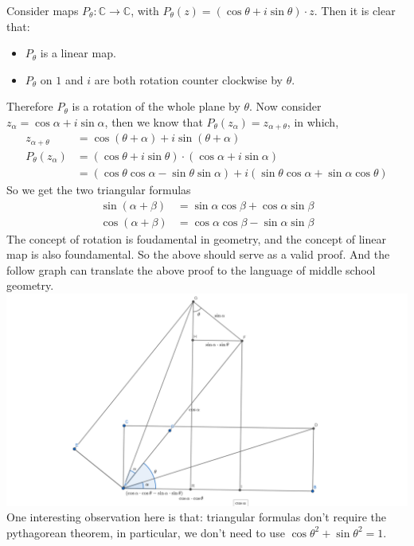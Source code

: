 \documentclass[pdf]{article}
\begin{document}
Consider maps $P_{\theta}: \mathbb{C}\to\mathbb{C}$, with $P_\theta(z) = (\cos\theta + i\sin\theta) \cdot z$. Then it is clear that:
\begin{itemize}
\item $P_{\theta}$ is a linear map.
\item $P_{\theta}$ on $1$ and $i$ are both rotation counter clockwise by $\theta$.
\end{itemize}
Therefore $P_{\theta}$ is a rotation of the whole plane by $\theta$. Now consider $z_\alpha = \cos\alpha + i\sin\alpha$, then we know that $P_\theta(z_\alpha) = z_{\alpha + \theta}$, in which,
\begin{align*}
z_{\alpha + \theta} &= \cos(\theta+\alpha) + i\sin(\theta+\alpha)\\
P_\theta(z_\alpha)  &= (\cos\theta + i\sin\theta)\cdot (\cos\alpha + i\sin\alpha)\\
&= (\cos\theta\cos\alpha  - \sin\theta\sin\alpha) + i(\sin\theta\cos\alpha  + \sin\alpha\cos\theta)
\end{align*}
So we get the two triangular formulas
\begin{align*}
\sin(\alpha+\beta) &= \sin\alpha\cos\beta + \cos\alpha\sin\beta\\
\cos(\alpha+\beta) &= \cos\alpha\cos\beta - \sin\alpha\sin\beta
\end{align*}
The concept of rotation is foudamental in geometry, and the concept of linear map is also foundamental. So the above should serve as a valid proof. And the follow graph can translate the above proof to the language of middle school geometry.\\
\includegraphics{triangular_formula}
One interesting observation here is that: triangular formulas don't require the pythagorean theorem, in particular, we don't need to use $\cos\theta^2 + \sin\theta^2 = 1.$
\end{document}

